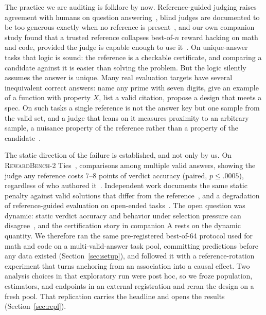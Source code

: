 \documentclass[11pt]{article}
\begin{document}
The practice we are auditing is folklore by now.
Reference-guided judging raises agreement with humans on question answering~\cite{refguided2024}, blind judges are documented to be too generous exactly when no reference is present~\cite{generous2026}, and our own companion study found that a trusted reference collapses best-of-$n$ reward hacking on math and code, provided the judge is capable enough to use it~\cite{companionA}.
On unique-answer tasks that logic is sound: the reference is a checkable certificate, and comparing a candidate against it is easier than solving the problem.
But the logic silently assumes the answer is unique.
Many real evaluation targets have several inequivalent correct answers: name any prime with seven digits, give an example of a function with property $X$, list a valid citation, propose a design that meets a spec.
On such tasks a single reference is not the answer key but one sample from the valid set, and a judge that leans on it measures proximity to an arbitrary sample, a nuisance property of the reference rather than a property of the candidate~\cite{companionB}.

The static direction of the failure is established, and not only by us.
On \textsc{RewardBench-2} Ties~\cite{malik2025rewardbench2}, comparisons among multiple valid answers, showing the judge any reference costs $7$--$8$ points of verdict accuracy (paired, $p \le .0005$), regardless of who authored it~\cite{companionA}.
Independent work documents the same static penalty against valid solutions that differ from the reference~\cite{fixation2025}, and a degradation of reference-guided evaluation on open-ended tasks~\cite{judgingref2026}.
The open question was dynamic: static verdict accuracy and behavior under selection pressure can disagree~\cite{gao2022scaling}, and the certification story in companion A rests on the dynamic quantity.
We therefore ran the same pre-registered best-of-64 protocol used for math and code on a multi-valid-answer task pool, committing predictions before any data existed (Section~\ref{sec:setup}), and followed it with a reference-rotation experiment that turns anchoring from an association into a causal effect.
Two analysis choices in that exploratory run were post hoc, so we froze population, estimators, and endpoints in an external registration and reran the design on a fresh pool.
That replication carries the headline and opens the results (Section~\ref{sec:repl}).
\end{document}
